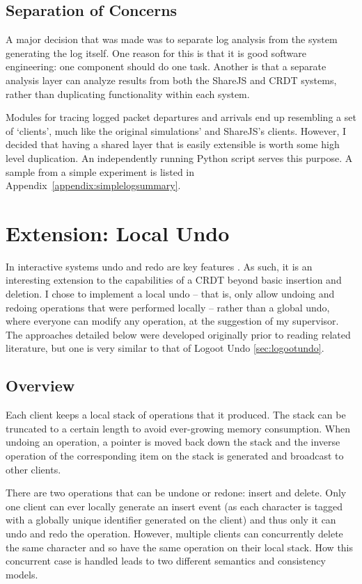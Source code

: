 \documentclass[12pt,a4paper,twoside,openright]{report}
\begin{document}
	
	\subsection{Separation of Concerns}
	
	A major decision that was made was to separate log analysis from the system generating the log itself. One reason for this is that it is good software engineering: one component should do one task. Another is that a separate analysis layer can analyze results from both the ShareJS and CRDT systems, rather than duplicating functionality within each system. 
	
	Modules for tracing logged packet departures and arrivals end up resembling a set of `clients', much like the original simulations' and ShareJS's clients. However, I decided that having a shared layer that is easily extensible is worth some high level duplication. An independently running Python script serves this purpose. A sample from a simple experiment is listed in Appendix~\ref{appendix:simplelogsummary}.	
	
	
	
\section{Extension: Local Undo} \label{sec:undo}
	
	In interactive systems undo and redo are key features \cite{shneiderman1982}. As such, it is an interesting extension to the capabilities of a CRDT beyond basic insertion and deletion. I chose to implement a local undo -- that is, only allow undoing and redoing operations that were performed locally -- rather than a global undo, where everyone can modify any operation, at the suggestion of my supervisor. The approaches detailed below were developed originally prior to reading related literature, but one is very similar to that of Logoot Undo \cref{sec:logootundo}.
	
	\subsection{Overview}
	Each client keeps a local stack of operations that it produced. The stack can be truncated to a certain length to avoid ever-growing memory consumption. When undoing an operation, a pointer is moved back down the stack and the inverse operation of the corresponding item on the stack is generated and broadcast to other clients.
	
	There are two operations that can be undone or redone: insert and delete. Only one client can ever locally generate an insert event (as each character is tagged with a globally unique identifier generated on the client) and thus only it can undo and redo the operation. However, multiple clients can concurrently delete the same character and so have the same operation on their local stack. How this concurrent case is handled leads to two different semantics and consistency models.
	
\end{document}
